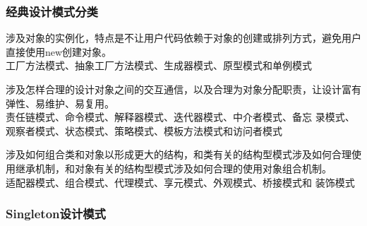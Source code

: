 \begin{frame}[fragile]
  \frametitle{经典设计模式分类}
   涉及对象的实例化，特点是不让用户代码依赖于对象的创建或排列方式，避免用户直接使用new创建对象。\\
  {\Red\kai 工厂方法模式、抽象工厂方法模式、生成器模式、原型模式和单例模式}\pause
  
   涉及怎样合理的设计对象之间的交互通信，以及合理为对象分配职责，让设计富有弹性、易维护、易复用。\\
  {\Blue\kai 责任链模式、命令模式、解释器模式、迭代器模式、中介者模式、备忘
    录模式、观察者模式、状态模式、策略模式、模板方法模式和访问者模式}\pause

   涉及如何组合类和对象以形成更大的结构，和类有关的结构型模式涉及如何合理使用继承机制，和对象有关的结构型模式涉及如何合理的使用对象组合机制。\\
  {\Mage\kai 适配器模式、组合模式、代理模式、享元模式、外观模式、桥接模式和
    装饰模式}
\end{frame}


\begin{frame}[fragile] %
  \frametitle{Singleton设计模式}

  


\end{frame}

